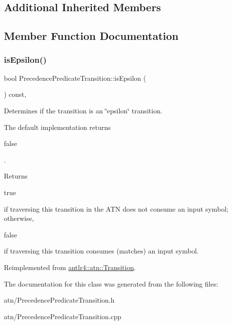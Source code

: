 \subsection*{Additional Inherited Members}


\subsection{Member Function Documentation}
\mbox{\label{classantlr4_1_1atn_1_1PrecedencePredicateTransition_a68e686bc0b7ddce9b5fc3f93a763ca52}} 
\subsubsection{\texorpdfstring{is\+Epsilon()}{isEpsilon()}}
{\footnotesize\ttfamily bool Precedence\+Predicate\+Transition\+::is\+Epsilon (\begin{DoxyParamCaption}{ }\end{DoxyParamCaption}) const\hspace{0.3cm}{\ttfamily [override]}, {\ttfamily [virtual]}}

Determines if the transition is an \char`\"{}epsilon\char`\"{} transition.

The default implementation returns
\begin{DoxyCode}
\textcolor{keyword}{false} 
\end{DoxyCode}
 .

\begin{DoxyReturn}{Returns}

\begin{DoxyCode}
\textcolor{keyword}{true} 
\end{DoxyCode}
 if traversing this transition in the A\+TN does not consume an input symbol; otherwise,
\begin{DoxyCode}
\textcolor{keyword}{false} 
\end{DoxyCode}
 if traversing this transition consumes (matches) an input symbol. 
\end{DoxyReturn}


Reimplemented from \hyperlink{classantlr4_1_1atn_1_1Transition_a8e712c7a46586d73c054c56f481b1be7}{antlr4\+::atn\+::\+Transition}.



The documentation for this class was generated from the following files\+:\begin{DoxyCompactItemize}
\item 
atn/Precedence\+Predicate\+Transition.\+h\item 
atn/Precedence\+Predicate\+Transition.\+cpp\end{DoxyCompactItemize}
